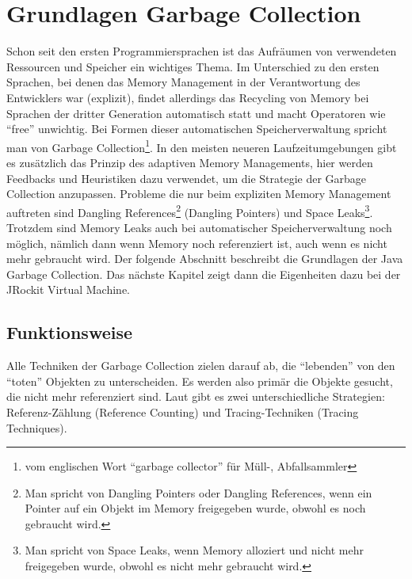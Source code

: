 \chapter{Grundlagen Garbage Collection}\label{grundlagen_gc}
Schon seit den ersten Programmiersprachen ist das Aufräumen von verwendeten Ressourcen und Speicher ein wichtiges Thema. Im Unterschied zu den ersten Sprachen, bei denen das Memory Management in der Verantwortung des Entwicklers war (explizit), findet allerdings das Recycling von Memory bei Sprachen der dritter Generation automatisch statt und macht Operatoren wie ``free'' unwichtig. Bei Formen dieser automatischen Speicherverwaltung spricht man von Garbage Collection\footnote{vom englischen Wort ``garbage collector'' für Müll-, Abfallsammler}. In den meisten neueren Laufzeitumgebungen gibt es zusätzlich das Prinzip  des adaptiven Memory Managements, hier werden Feedbacks und Heuristiken dazu verwendet, um die Strategie der Garbage Collection anzupassen.
Probleme die nur beim expliziten Memory Management auftreten sind  Dangling References\footnote{Man spricht von Dangling Pointers oder Dangling References, wenn ein Pointer auf ein Objekt im Memory freigegeben wurde, obwohl es noch gebraucht wird.} (Dangling Pointers) und Space Leaks\footnote{Man spricht von Space Leaks, wenn Memory alloziert und nicht mehr freigegeben wurde, obwohl es nicht mehr gebraucht wird.\cite{sunMemoryManagementWP}}. Trotzdem sind Memory Leaks auch bei automatischer Speicherverwaltung noch möglich, nämlich dann wenn Memory noch referenziert ist, auch wenn es nicht mehr gebraucht wird.
Der folgende Abschnitt beschreibt die Grundlagen der Java Garbage Collection. Das nächste Kapitel zeigt dann die Eigenheiten dazu bei der JRockit Virtual Machine.

\section{Funktionsweise}
Alle Techniken der Garbage Collection zielen darauf ab, die ``lebenden'' von den ``toten'' Objekten zu unterscheiden. Es werden also primär die Objekte gesucht, die nicht mehr referenziert sind. Laut \cite[S. 77]{lagergren2010oracle} gibt es zwei unterschiedliche Strategien: Referenz-Zählung (Reference Counting) und Tracing-Techniken (Tracing Techniques).

